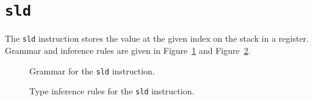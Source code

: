 \section{\texttt{sld}}\label{sec:nstar-instructionset-sld}

The \texttt{sld} instruction stores the value at the given index on the stack in a register.
Grammar and inference rules are given in Figure~\ref{fig:nstar-instructionset-sld-grammar} and Figure~\ref{fig:nstar-instructionset-sld-typerules}.

\begin{figure}[H]
  \centering


  \caption{Grammar for the \texttt{sld} instruction.}
  \label{fig:nstar-instructionset-sld-grammar}
\end{figure}

\begin{figure}[H]
  \centering


  \caption{Type inference rules for the \texttt{sld} instruction.}
  \label{fig:nstar-instructionset-sld-typerules}
\end{figure}

